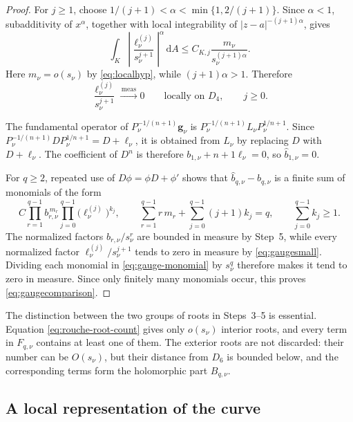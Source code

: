 \documentclass[12pt,letterpaper,reqno]{amsart}
\theoremstyle{definition}
\numberwithin{equation}{section}
\newcommand{\dA}{\,\mathrm dA}
\newcommand{\convmeas}{\xrightarrow{\,\mathrm{meas}\,}}
\newcommand{\gv}{\bm g}
\begin{document}
\begin{proof}
For \(j\geq1\), choose
\(1/(j+1)<\alpha<\min\{1,2/(j+1)\}\).
Since \(\alpha<1\), subadditivity of \(x^\alpha\), together with local
integrability of
\(|z-a|^{-(j+1)\alpha}\), gives
\[
 \int_K
 \left|
 \frac{\ell_\nu^{(j)}}{s_\nu^{j+1}}
 \right|^\alpha
 \dA
 \leq
 C_{K,j}
 \frac{m_\nu}{s_\nu^{(j+1)\alpha}}.
\]
Here \(m_\nu=o(s_\nu)\) by \eqref{eq:localhyp}, while
\((j+1)\alpha>1\). Therefore
\begin{equation}\label{eq:gaugesmall}
 \frac{\ell_\nu^{(j)}}{s_\nu^{j+1}}
 \convmeas0
 \qquad\text{locally on }D_4,
 \qquad j\geq0.
\end{equation}

The fundamental operator of \(P_\nu^{-1/(n+1)}\gv_\nu\) is
\(P_\nu^{-1/(n+1)}L_\nu P_\nu^{1/{n+1}}\). Since
\(P_\nu^{-1/(n+1)}DP_\nu^{1/{n+1}}=D+\ell_\nu\), it is obtained from
\(L_\nu\) by replacing \(D\) with \(D+\ell_\nu\). The coefficient of
\(D^{n}\) is therefore
\(b_{1,\nu}+{n+1}\ell_\nu=0\), so
\(\widehat b_{1,\nu}=0\).

For \(q\geq2\), repeated use of
\(D\phi=\phi D+\phi'\) shows that
\(\widehat b_{q,\nu}-b_{q,\nu}\) is a finite sum of monomials of the
form
\begin{equation}\label{eq:gauge-monomial}
 C
 \prod_{r=1}^{q-1}b_{r,\nu}^{\,m_r}
 \prod_{j=0}^{q-1}
 \bigl(\ell_\nu^{(j)}\bigr)^{k_j},
 \qquad
 \sum_{r=1}^{q-1}r\,m_r
 +
 \sum_{j=0}^{q-1}(j+1)k_j
 =
 q,
 \qquad
 \sum_{j=0}^{q-1}k_j\geq1.
\end{equation}
The normalized factors \(b_{r,\nu}/s_\nu^r\) are bounded in measure
by Step~5, while every normalized factor
\(\ell_\nu^{(j)}/s_\nu^{j+1}\) tends to zero in measure by
\eqref{eq:gaugesmall}. Dividing each monomial in
\eqref{eq:gauge-monomial} by \(s_\nu^q\) therefore makes it tend to
zero in measure. Since only finitely many monomials occur, this proves
\eqref{eq:gaugecomparison}.
\end{proof}

The distinction between the two groups of roots in Steps~3--5 is
essential. Equation \eqref{eq:rouche-root-count} gives only
\(o(s_\nu)\) interior roots, and every term in \(F_{q,\nu}\) contains
at least one of them. The exterior roots are not discarded: their
number can be \(O(s_\nu)\), but their distance from \(D_6\) is bounded
below, and the corresponding terms form the holomorphic part
\(B_{q,\nu}\).


\subsection{A local representation of the curve}
\label{sec:representation}
\end{document}
